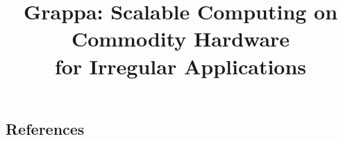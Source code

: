 



\title{Grappa: Scalable Computing on Commodity Hardware \\for Irregular Applications}

\maketitle
\begin{abstract}

\end{abstract}



















%

\subsection{References}





